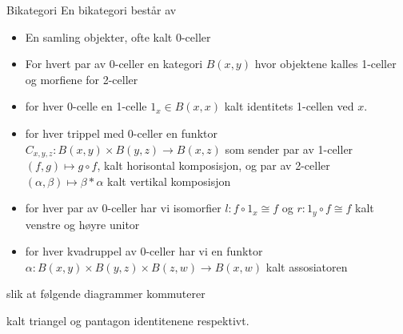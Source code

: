 \begin{definition}{Bikategori}
    En bikategori består av 
    \begin{itemize}
        \item En samling objekter, ofte kalt 0-celler
        \item For hvert par av 0-celler en kategori $B(x, y)$ hvor objektene kalles 1-celler og morfiene for 2-celler
        \item for hver 0-celle en 1-celle $1_x \in B(x,x)$ kalt identitets 1-cellen ved $x$. 
        \item for hver trippel med 0-celler en funktor $C_{x,y,z}:B(x,y)\times B(y,z)\longrightarrow B(x,z)$ som sender par av 1-celler $(f, g)\mapsto g\circ f$, kalt horisontal komposisjon, og par av 2-celler $(\alpha, \beta ) \mapsto \beta \ast \alpha$ kalt vertikal komposisjon
        \item for hver par av 0-celler har vi isomorfier $l:f\circ 1_x \cong f$ og $r:1_y\circ f\cong f$ kalt venstre og høyre unitor
        \item for hver kvadruppel av 0-celler har vi en funktor $\alpha : B(x, y)\times B(y, z) \times B(z, w) \longrightarrow B(x, w)$ kalt assosiatoren
    \end{itemize}
    slik at følgende diagrammer kommuterer
    
    \begin{center}
        
    \end{center}
    kalt triangel og pantagon identitenene respektivt. 
\end{definition}

